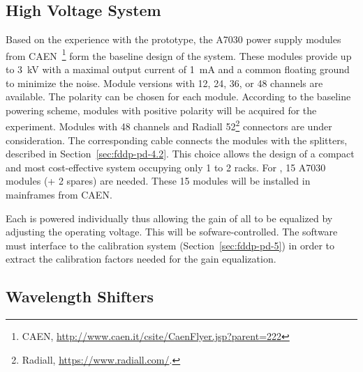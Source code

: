 \subsection{High Voltage System}
\label{sec:fddp-pd-2.3}

Based on the experience with the  %
prototype, %
the A7030 power supply modules from CAEN~\footnote{CAEN\texttrademark{}, \url{http://www.caen.it/csite/CaenFlyer.jsp?parent=222}} 
form the baseline design of the   system. 
These modules provide up to \SI{3}{kV} with a maximal output current of \SI{1}{mA} and a common floating ground to minimize the noise. Module versions with \num{12}, \num{24}, \num{36}, or \num{48}  channels are available. The  polarity can be chosen for each module. According to the baseline  powering scheme, modules with positive  polarity will be acquired for the experiment. Modules with \num{48}  channels and Radiall \num{52}\footnote{Radiall\texttrademark{}, \url{https://www.radiall.com/}.}  connectors are %
under consideration. The corresponding  cable connects the modules with the  splitters, described in Section~\ref{sec:fddp-pd-4.2}. This choice allows the design of a compact and most cost-effective system occupying only %
\num{1} to \num{2} racks. %
For \dpnumpmtch {}, \num{15} A7030 modules (+ \num{2} spares) are needed. These \num{15}  modules will be installed in mainframes from CAEN.

Each  is powered individually thus allowing the gain of all  to be equalized by adjusting the operating voltage. %
This will be sofware-controlled. The software must interface to the  calibration system (Section~\ref{sec:fddp-pd-5}) in order to extract the calibration factors needed for the gain equalization.

\subsection{Wavelength Shifters}
\label{sec:fddp-pd-2.4}

